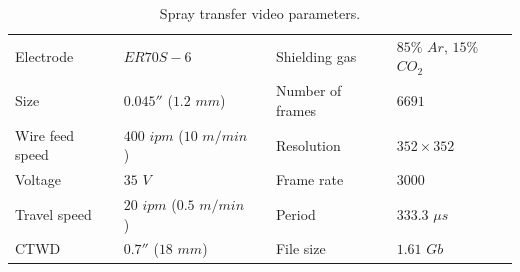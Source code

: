 \begin{table}
\centering
\caption[Spray transfer video parameters]{Spray transfer video parameters.}
\label{table:spray_params}
\begin{tabular}{|l|l|lll}
\cline{1-2} \cline{4-5}
Electrode       & $ER70S-6$             & \multicolumn{1}{l|}{} & \multicolumn{1}{l|}{Shielding gas}     & \multicolumn{1}{l|}{$85\%$ $Ar$, $15\%$ $CO_2$} \\ \cline{1-2} \cline{4-5} 
Size            & $0.045''$ ($1.2$ $mm$)     & \multicolumn{1}{l|}{} & \multicolumn{1}{l|}{Number of frames}  & \multicolumn{1}{l|}{$6691$}              \\ \cline{1-2} \cline{4-5} 
Wire feed speed & $400$ $ipm$ ($10$ $m/min$) & \multicolumn{1}{l|}{} & \multicolumn{1}{l|}{Resolution}        & \multicolumn{1}{l|}{$352 \times 352$}           \\ \cline{1-2} \cline{4-5} 
Voltage         & $35$ $V$                 & \multicolumn{1}{l|}{} & \multicolumn{1}{l|}{Frame rate} & \multicolumn{1}{l|}{$3000$}              \\ \cline{1-2} \cline{4-5} 
Travel speed    & $20$ $ipm$ ($0.5$ $m/min$)  & \multicolumn{1}{l|}{} & \multicolumn{1}{l|}{Period}            & \multicolumn{1}{l|}{$333.3$ $\mu s$}           \\ \cline{1-2} \cline{4-5} 
CTWD & $0.7''$ ($18$ $mm$) &\multicolumn{1}{l|}{} & \multicolumn{1}{l|}{File size}            & \multicolumn{1}{l|}{$1.61$ $Gb$}  \\ \cline{1-2}\cline{4-5} 
\end{tabular}
\end{table}




